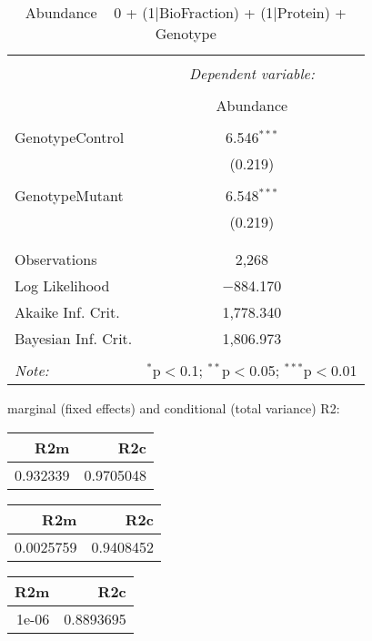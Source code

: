 \documentclass[11pt]{report}
\begin{document}
\begin{table}[!htbp] \centering 
  \caption{Abundance ~ 0 + (1|BioFraction) + (1|Protein) + Genotype} 
  \label{} 
\begin{tabular}{@{\extracolsep{5pt}}lc} 
\\[-1.8ex]\hline 
\hline \\[-1.8ex] 
 & \multicolumn{1}{c}{\textit{Dependent variable:}} \\ 
\cline{2-2} 
\\[-1.8ex] & Abundance \\ 
\hline \\[-1.8ex] 
 GenotypeControl & 6.546$^{***}$ \\ 
  & (0.219) \\ 
  & \\ 
 GenotypeMutant & 6.548$^{***}$ \\ 
  & (0.219) \\ 
  & \\ 
\hline \\[-1.8ex] 
Observations & 2,268 \\ 
Log Likelihood & $-$884.170 \\ 
Akaike Inf. Crit. & 1,778.340 \\ 
Bayesian Inf. Crit. & 1,806.973 \\ 
\hline 
\hline \\[-1.8ex] 
\textit{Note:}  & \multicolumn{1}{r}{$^{*}$p$<$0.1; $^{**}$p$<$0.05; $^{***}$p$<$0.01} \\ 
\end{tabular} 
\end{table} 
marginal (fixed effects) and conditional (total variance) R2:

\begin{tabular}{r|r}
\hline
R2m & R2c\\
\hline
0.932339 & 0.9705048\\
\hline
\end{tabular}

\begin{tabular}{r|r}
\hline
R2m & R2c\\
\hline
0.0025759 & 0.9408452\\
\hline
\end{tabular}

\begin{tabular}{r|r}
\hline
R2m & R2c\\
\hline
1e-06 & 0.8893695\\
\hline
\end{tabular}
\end{document}
